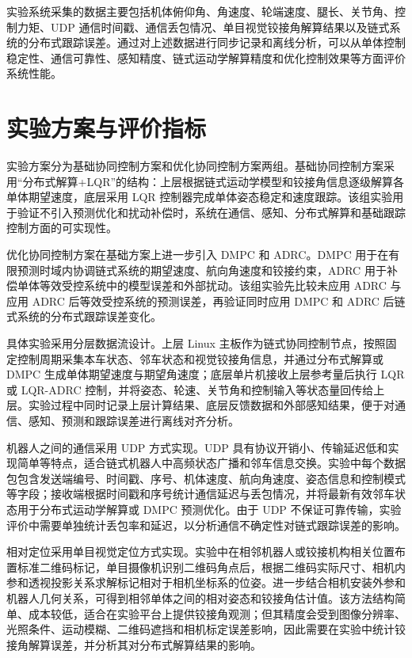\documentclass[type=bachelor]{bithesis}
\begin{document}
实验系统采集的数据主要包括机体俯仰角、角速度、轮端速度、腿长、关节角、控制力矩、UDP 通信时间戳、通信丢包情况、单目视觉铰接角解算结果以及链式系统的分布式跟踪误差。通过对上述数据进行同步记录和离线分析，可以从单体控制稳定性、通信可靠性、感知精度、链式运动学解算精度和优化控制效果等方面评价系统性能。

\section{实验方案与评价指标}
实验方案分为基础协同控制方案和优化协同控制方案两组。基础协同控制方案采用“分布式解算+LQR”的结构：上层根据链式运动学模型和铰接角信息逐级解算各单体期望速度，底层采用 LQR 控制器完成单体姿态稳定和速度跟踪。该组实验用于验证不引入预测优化和扰动补偿时，系统在通信、感知、分布式解算和基础跟踪控制方面的可实现性。

优化协同控制方案在基础方案上进一步引入 DMPC 和 ADRC。DMPC 用于在有限预测时域内协调链式系统的期望速度、航向角速度和铰接约束，ADRC 用于补偿单体等效受控系统中的模型误差和外部扰动。该组实验先比较未应用 ADRC 与应用 ADRC 后等效受控系统的预测误差，再验证同时应用 DMPC 和 ADRC 后链式系统的分布式跟踪误差变化。

具体实验采用分层数据流设计。上层 Linux 主板作为链式协同控制节点，按照固定控制周期采集本车状态、邻车状态和视觉铰接角信息，并通过分布式解算或 DMPC 生成单体期望速度与期望角速度；底层单片机接收上层参考量后执行 LQR 或 LQR-ADRC 控制，并将姿态、轮速、关节角和控制输入等状态量回传给上层。实验过程中同时记录上层计算结果、底层反馈数据和外部感知结果，便于对通信、感知、预测和跟踪误差进行离线对齐分析。

机器人之间的通信采用 UDP 方式实现。UDP 具有协议开销小、传输延迟低和实现简单等特点，适合链式机器人中高频状态广播和邻车信息交换。实验中每个数据包包含发送端编号、时间戳、序号、机体速度、航向角速度、姿态信息和控制模式等字段；接收端根据时间戳和序号统计通信延迟与丢包情况，并将最新有效邻车状态用于分布式运动学解算或 DMPC 预测优化。由于 UDP 不保证可靠传输，实验评价中需要单独统计丢包率和延迟，以分析通信不确定性对链式跟踪误差的影响。

相对定位采用单目视觉定位方式实现。实验中在相邻机器人或铰接机构相关位置布置标准二维码标记，单目摄像机识别二维码角点后，根据二维码实际尺寸、相机内参和透视投影关系求解标记相对于相机坐标系的位姿。进一步结合相机安装外参和机器人几何关系，可得到相邻单体之间的相对姿态和铰接角估计值。该方法结构简单、成本较低，适合在实验平台上提供铰接角观测；但其精度会受到图像分辨率、光照条件、运动模糊、二维码遮挡和相机标定误差影响，因此需要在实验中统计铰接角解算误差，并分析其对分布式解算结果的影响。
\end{document}
